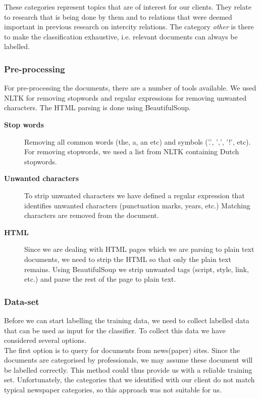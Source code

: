These categories represent topics that are of interest for our clients. They relate to research that is being done by them and to relations that were deemed important in previous research on intercity relations. The category \textit{other} is there to make the classification exhaustive, i.e. relevant documents can always be labelled.

\subsubsection{Pre-processing}
For pre-processing the documents, there are a number of tools available. We used NLTK \cite{nlkt_stemming} for removing stopwords and regular expressions for removing unwanted characters. The HTML parsing is done using BeautifulSoup\cite{BeautifulSoup}.

\begin{description}
\item[\textbf{Stop words}]
Removing all common words (the, a, an etc) and symbols ('.', ',', '!', etc). For removing stopwords, we used a list from NLTK containing Dutch stopwords.

\item[\textbf{Unwanted characters}]
To strip unwanted characters we have defined a regular expression that identifies unwanted characters (punctuation marks, years, etc.) Matching characters are removed from the document. 

\item[\textbf{HTML}]
Since we are dealing with HTML pages which we are parsing to plain text documents, we need to strip the HTML so that only the plain text remains. Using BeautifulSoup we strip unwanted tags (script, style, link, etc.) and parse the rest of the page to plain text.
\end{description}

\subsubsection{Data-set}
Before we can start labelling the training data, we need to collect labelled data that can be used as input for the classifier. To collect this data we have considered several options.\\

The first option is to query for documents from news(paper) sites. Since the documents are categorised by professionals, we may assume these document will be labelled correctly. This method could thus provide us with a reliable training set.
Unfortunately, the categories that we identified with our client do not match typical newspaper categories, so this approach was not suitable for us.\\

